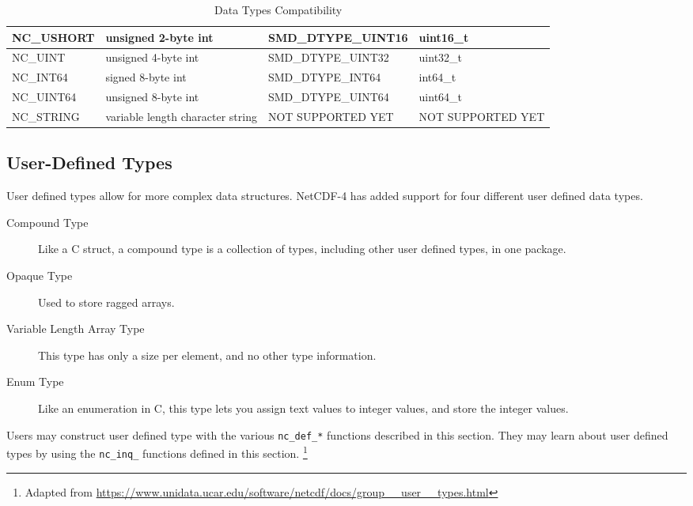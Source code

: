 \begin{table}[H]
\begin{tabular}{|l|m{4.7cm}|l|l|}
\scriptsize{NC\_USHORT} & \small{unsigned 2-byte int} &    \scriptsize{SMD\_DTYPE\_UINT16}        & \small{uint16\_t}    \\ \hline
\scriptsize{NC\_UINT} & \small{unsigned 4-byte int} &   \scriptsize{SMD\_DTYPE\_UINT32}          & \small{uint32\_t}    \\ \hline
\scriptsize{NC\_INT64} & \small{signed 8-byte int} &    \scriptsize{SMD\_DTYPE\_INT64}         & \small{int64\_t}    \\ \hline
\scriptsize{NC\_UINT64} & \small{unsigned 8-byte int} &    \scriptsize{SMD\_DTYPE\_UINT64}        & \small{uint64\_t}    \\ \hline
\scriptsize{NC\_STRING} & \small{variable length character string} & \scriptsize{NOT SUPPORTED YET} & \scriptsize{NOT SUPPORTED YET} \\ \hline
\end{tabular}
\caption{\label{datatypes-netcdf} Data Types Compatibility}
\end{table}

\subsection{User-Defined Types}
\label{ud-type}

{\itshape

User defined types allow for more complex data structures. NetCDF-4 has added support for four different user defined data types.

\begin{description}

\item[Compound Type]

Like a C struct, a compound type is a collection of types, including other user defined types, in one package.

\item[Opaque Type]

Used to store ragged arrays.

\item[Variable Length Array Type]

This type has only a size per element, and no other type information.

\item[Enum Type]

Like an enumeration in C, this type lets you assign text values to integer values, and store the integer values.

\end{description}

Users may construct user defined type with the various \texttt{nc\_def\_*} functions described in this section.
They may learn about user defined types by using the \texttt{nc\_inq\_} functions defined in this section.
\footnote{Adapted from \url{https://www.unidata.ucar.edu/software/netcdf/docs/group__user__types.html}}

}

